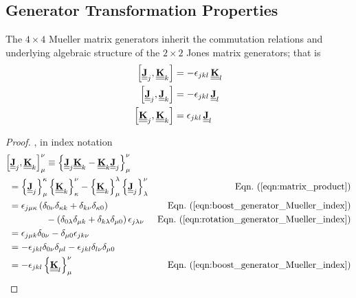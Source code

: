 \subsection{Generator Transformation Properties}

The $4 \times 4$ Mueller matrix generators inherit the commutation relations 
and underlying algebraic structure of the $2 \times 2$ Jones matrix generators;
%
that is
%
\begin{align}
\left[\underline{\underline{{\bf J}}}_j, \underline{\underline{{\bf K}}}_k\right] & = -\epsilon_{jkl} \,\underline{\underline{{\bf K}}}_l \label{eqn:commutator_Boost} \\
\left[\underline{\underline{{\bf J}}}_j, \underline{\underline{{\bf J}}}_k\right] & = -\epsilon_{jkl} \,\underline{\underline{{\bf J}}}_l \label{eqn:commutator_Rotation} \\
\left[\underline{\underline{{\bf K}}}_j, \underline{\underline{{\bf K}}}_k\right] & = \epsilon_{jkl} \,\underline{\underline{{\bf J}}}_l  \label{eqn:commutator_mixed} 
\end{align}

\begin{proof}
, in index notation
\begin{align*}
\left[\MM{J}_j, \MM{K}_k\right]_\irow^\icol 
    & \equiv \left\{ \MM{J}_j \MM{K}_k - \MM{K}_k \MM{J}_j \right\}_\irow^\icol \\
    & \hspace{-4em} = \left\{\MM{J}_j\right\}_\irow^\kappa \left\{\MM{K}_k\right\}_\kappa^\icol 
      - \left\{\MM{K}_k\right\}_\irow^\lambda \left\{\MM{J}_j\right\}_\lambda^\icol & \peqn{matrix_product} \\
    & \hspace{-4em}= \epsilon_{j\irow\kappa} \left( \delta_{0\icol}\delta_{\kappa k} + \delta_{k\icol} \delta_{\kappa 0} \right) 
        & \peqn{boost_generator_Mueller_index} \\
    & - \left( \delta_{0\lambda}\delta_{\irow k} + \delta_{k\lambda} \delta_{\irow 0} \right) \epsilon_{j\lambda\icol}
        & \peqn{rotation_generator_Mueller_index} \\
   & \hspace{-4em} = \epsilon_{j\irow k} \delta_{0\icol} - \delta_{\irow 0} \epsilon_{jk\icol} \\
   & \hspace{-4em} = -\epsilon_{jkl} \delta_{0\icol} \delta_{\irow l} - \epsilon_{jkl} \delta_{l \icol} \delta_{\irow 0} \\
   & \hspace{-4em} = -\epsilon_{jkl} \left\{ \MM{K}_l \right\}_\irow^\icol & \peqn{boost_generator_Mueller_index}
\end{align*}
\end{proof}

